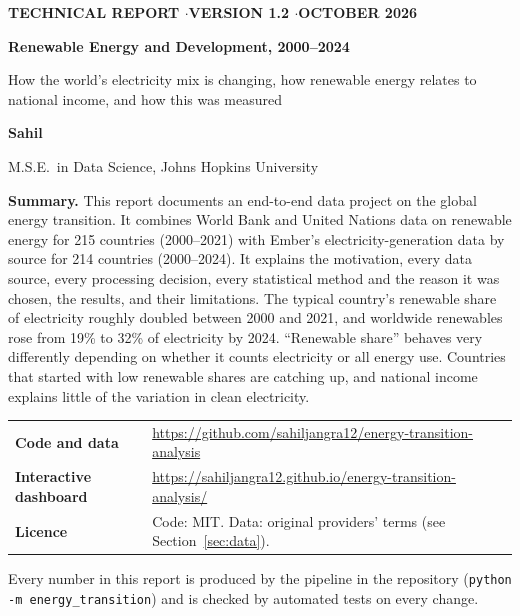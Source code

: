 \documentclass[11pt,a4paper]{article}
\newcommand{\code}[1]{\texttt{\small #1}}
\begin{document}
\begin{titlepage}
\setlength{\parindent}{0pt}
\vspace*{2.5cm}
{\sffamily\small\bfseries\color{accent} TECHNICAL REPORT \quad$\cdot$\quad VERSION 1.2 \quad$\cdot$\quad OCTOBER 2026\par}
\vspace{0.6cm}
{\sffamily\fontsize{28}{34}\selectfont\bfseries Renewable Energy and Development, 2000--2024\par}
\vspace{0.4cm}
{\Large\color{ink2} How the world's electricity mix is changing, how renewable energy relates to national income, and how this was measured\par}
\vspace{1.2cm}
{\large\sffamily\bfseries Sahil\par}
{\color{ink2} M.S.E.\ in Data Science, Johns Hopkins University\par}
\vspace{1.4cm}

\begin{tcolorbox}[enhanced,colback=boxbg,colframe=accent,boxrule=0pt,leftrule=3pt,arc=2pt,left=10pt,right=10pt,top=8pt,bottom=8pt]
\textbf{\sffamily Summary.} This report documents an end-to-end data project on the global energy transition. It combines World Bank and United Nations data on renewable energy for 215 countries (2000--2021) with Ember's electricity-generation data by source for 214 countries (2000--2024). It explains the motivation, every data source, every processing decision, every statistical method and the reason it was chosen, the results, and their limitations. The typical country's renewable share of electricity roughly doubled between 2000 and 2021, and worldwide renewables rose from 19\% to 32\% of electricity by 2024. ``Renewable share'' behaves very differently depending on whether it counts electricity or all energy use. Countries that started with low renewable shares are catching up, and national income explains little of the variation in clean electricity.
\end{tcolorbox}

\vspace{1cm}
{\small\begin{tabular}{@{}ll@{}}
\textbf{\sffamily Code and data} & \url{https://github.com/sahiljangra12/energy-transition-analysis} \\[2pt]
\textbf{\sffamily Interactive dashboard} & \url{https://sahiljangra12.github.io/energy-transition-analysis/} \\[2pt]
\textbf{\sffamily Licence} & Code: MIT. Data: original providers' terms (see Section~\ref{sec:data}).
\end{tabular}}
\vfill
{\small\color{ink2} Every number in this report is produced by the pipeline in the repository (\code{python -m energy\_transition}) and is checked by automated tests on every change.\par}
\end{titlepage}
\end{document}
